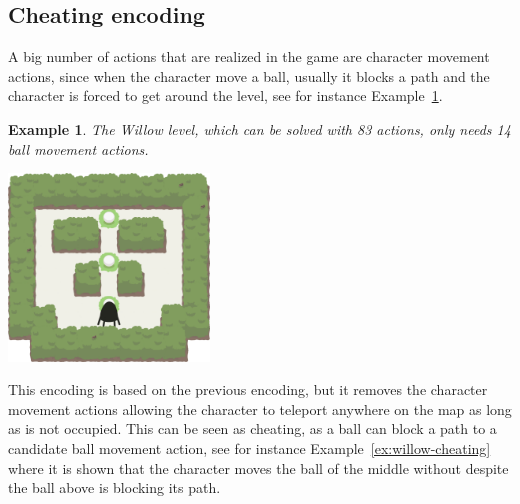 \documentclass{report}
\theoremstyle{plain}
\newtheorem{example}{Example}[section]
\begin{document}
\subsection{Cheating encoding}
A big number of actions that are realized in the game are character movement actions, since when the character move a ball, usually it blocks a path and the character is forced to get around the level, see for instance Example~\ref{ex:willow}.

\vspace{1\baselineskip}

\begin{example}\label{ex:willow}
The Willow level, which can be solved with 83 actions, only needs 14 ball movement actions.

\begin{center}
\includegraphics[width=0.4\textwidth]{willow-1.png}
\end{center}
\end{example}

\vspace{1\baselineskip}

This encoding is based on the previous encoding, but it removes the character movement actions allowing the character to teleport anywhere on the map as long as is not occupied. This can be seen as cheating, as a ball can block a path to a candidate ball movement action, see for instance Example~\ref{ex:willow-cheating} where it is shown that the character moves the ball of the middle without despite the ball above is blocking its path.

\vspace{1\baselineskip}
\end{document}
